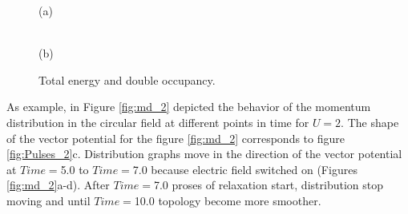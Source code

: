 \begin{figure}[h!]
\begin{minipage}[h]{0.5\linewidth}
 (a) \\
\end{minipage}
\hfill
\begin{minipage}[h]{0.5\linewidth}
 \\(b)
\end{minipage}
\caption{Total energy and double occupancy.}
\label{fig:Etot_2}
\end{figure}

As example, in Figure \ref{fig:md_2} depicted the behavior of the momentum distribution in the circular field at different points in time for $U=2$. The shape of the vector potential for the figure \ref{fig:md_2} corresponds to figure \ref{fig:Pulses_2}c.   Distribution graphs move in the direction of the vector potential at $Time=$5.0 to $Time=$7.0 because electric field switched on (Figures \ref{fig:md_2}a-d). After $Time=$7.0 proses of relaxation start, distribution stop moving and until $Time=$10.0 topology become more smoother.


